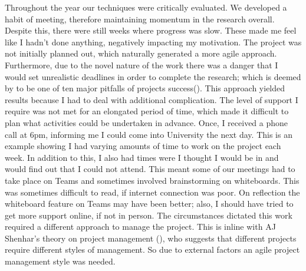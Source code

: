 Throughout the year our techniques were critically evaluated. We developed a habit of meeting, therefore maintaining momentum in the research overall. Despite this, there were still weeks where progress was slow. These made me feel like I hadn't done anything, negatively impacting my motivation. The project was not initially planned out, which naturally generated a more agile approach. Furthermore, due to the novel nature of the work there was a danger that I would set unrealistic deadlines in order to complete the research; which is deemed by \citeauthor{GanttPRO} to be one of ten major pitfalls of projects success(\cite{GanttPRO}). This approach yielded results because I had to deal with additional complication. The level of support I require was not met for an elongated period of time, which made it difficult to plan what activities could be undertaken in advance. Once, I received a phone call at 6pm, informing me I could come into University the next day. This is an example showing I had varying amounts of time to work on the project each week. In addition to this, I also had times were I thought I would be in and would find out that I could not attend. This meant some of our meetings had to take place on Teams and sometimes involved brainstorming on whiteboards. This was sometimes difficult to read, if internet connection was poor. On reflection the whiteboard feature on Teams may have been better; also, I should have tried to get more support online, if not in person. The circumstances dictated this work required a different approach to manage the project. This is inline with AJ Shenhar's theory on project management (\cite{Shenhar1}), who suggests that different projects require different styles of management. So due to external factors an agile project management style was needed.



